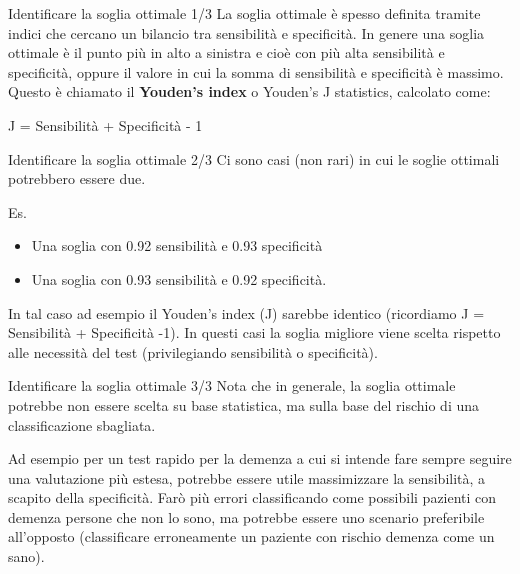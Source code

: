 \documentclass[
  ignorenonframetext,
]{beamer}
\providecommand{\tightlist}{%
  \setlength{\itemsep}{0pt}\setlength{\parskip}{0pt}}
\begin{document}
\begin{frame}{Identificare la soglia ottimale 1/3}
\label{identificare-la-soglia-ottimale-13}
La soglia ottimale è spesso definita tramite indici che cercano un
bilancio tra sensibilità e specificità. In genere una soglia ottimale è
il punto più in alto a sinistra e cioè con più alta sensibilità e
specificità, oppure il valore in cui la somma di sensibilità e
specificità è massimo. Questo è chiamato il \textbf{Youden's index} o
Youden's J statistics, calcolato come: \center

J = Sensibilità + Specificità - 1
\end{frame}

\begin{frame}{Identificare la soglia ottimale 2/3}
\label{identificare-la-soglia-ottimale-23}
Ci sono casi (non rari) in cui le soglie ottimali potrebbero essere due.

Es.

\begin{itemize}
\tightlist
\item
  Una soglia con 0.92 sensibilità e 0.93 specificità
\item
  Una soglia con 0.93 sensibilità e 0.92 specificità.
\end{itemize}

In tal caso ad esempio il Youden's index (J) sarebbe identico
(ricordiamo J = Sensibilità + Specificità -1). In questi casi la soglia
migliore viene scelta rispetto alle necessità del test (privilegiando
sensibilità o specificità).
\end{frame}

\begin{frame}{Identificare la soglia ottimale 3/3}
\label{identificare-la-soglia-ottimale-33}
Nota che in generale, la soglia ottimale potrebbe non essere scelta su
base statistica, ma sulla base del rischio di una classificazione
sbagliata.

Ad esempio per un test rapido per la demenza a cui si intende fare
sempre seguire una valutazione più estesa, potrebbe essere utile
massimizzare la sensibilità, a scapito della specificità. Farò più
errori classificando come possibili pazienti con demenza persone che non
lo sono, ma potrebbe essere uno scenario preferibile all'opposto
(classificare erroneamente un paziente con rischio demenza come un
sano).
\end{frame}
\end{document}
